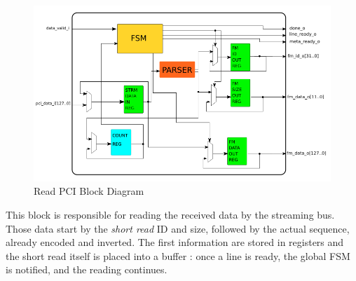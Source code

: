 \begin{figure}[H]
    \centering
    \includegraphics[scale = 0.5]{Figures/RDPCI_DIAG.png}
    \caption{Read PCI Block Diagram}
    \label{fig:rdi_pci_diag}
\end{figure}

This block is responsible for reading the received data by the streaming bus. Those data start by the \textsl{short read} ID and size, followed by the actual sequence, already encoded and inverted. The first information are stored in registers and the short read itself is placed into a buffer : once a line is ready, the global FSM is notified, and the reading continues. \\
\vspace*{8mm}

